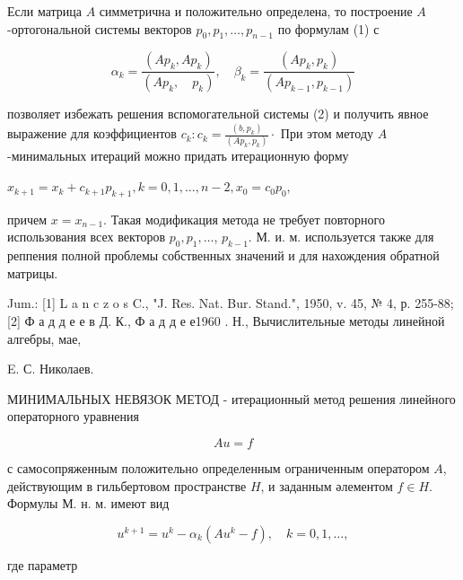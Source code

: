 \documentclass[10pt]{article}
\begin{document}
Если матрица $A$ симметрична и положительно определена, то построение $A$-ортогональной системы векторов $p_{0}, p_{1}, \ldots, p_{n-1}$ по формулам (1) с



\[

\alpha_{k}=\frac{\left(A p_{k}, A p_{k}\right)}{\left(A p_{k}, \quad p_{k}\right)}, \quad \beta_{k}=\frac{\left(A p_{k}, p_{k}\right)}{\left(A p_{k-1}, p_{k-1}\right)}

\]



позволяет избежать решения вспомогательной системы (2) и получить явное выражение для коэффициентов $c_{k}: c_{k}=\frac{\left(b, p_{k}\right)}{\left(A p_{k}, p_{k}\right)} \cdot$ При этом методу $A$-минимальных итераций можно придать итерационную форму



$x_{k+1}=x_{k}+c_{k+1} p_{k+1}, k=0,1, \ldots, n-2, x_{0}=c_{0} p_{0}$,



причем $x=x_{n-1}$. Такая модификация метода не требует повторного использования всех векторов $p_{0}, p_{1}, \ldots$, $p_{k-1}$. М. и. м. используется также для реппения полной проблемы собственных значений и для нахождения обратной матрицы.



Jum.: [1] L a n c z o s C., "J. Res. Nat. Bur. Stand.", 1950, v. 45, № 4, р. 255-88; [2] Ф а д д е е в Д. К., Ф а д д е е1960 . Н., Вычислительные методы линейной алгебры, мае,

E. С. Николаев.



МИНИМАЛЬНЫХ НЕВЯЗОК МЕТОД - итерационный метод решения линейного операторного уравнения



\[

A u=f

\]



с самосопряженным положительно определенным ограниченным оператором $A$, действующим в гильбертовом пространстве $H$, и заданным әлементом $f \in H$. Формулы М. н. м. имеют вид



\[

u^{k+1}=u^{k}-\alpha_{k}\left(A u^{k}-f\right), \quad k=0,1, \ldots,

\]



где параметр
\end{document}
